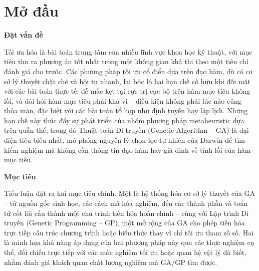 \chapter*{Mở đầu}
\label{chap:mo-dau}

\noindent\textbf{Đặt vấn đề}
\medskip

Tối ưu hóa là bài toán trung tâm của nhiều lĩnh vực khoa học kỹ thuật,
với mục tiêu tìm ra phương án tốt nhất trong một không gian khả thi
theo một tiêu chí đánh giá cho trước. Các phương pháp tối ưu cổ điển
dựa trên đạo hàm, dù có cơ sở lý thuyết chặt chẽ và hội tụ nhanh, lại
bộc lộ hai hạn chế cố hữu khi đối mặt với các bài toán thực tế: dễ mắc
kẹt tại cực trị cục bộ trên hàm mục tiêu không lồi, và đòi hỏi hàm mục
tiêu phải khả vi -- điều kiện không phải lúc nào cũng thỏa mãn, đặc
biệt với các bài toán tổ hợp như định tuyến hay lập lịch. Những hạn chế
này thúc đẩy sự phát triển của nhóm phương pháp metaheuristic dựa trên
quần thể, trong đó Thuật toán Di truyền (Genetic Algorithm -- GA) là
đại diện tiêu biểu nhất, mô phỏng nguyên lý chọn lọc tự nhiên của
Darwin để tìm kiếm nghiệm mà không cần thông tin đạo hàm hay giả định
về tính lồi của hàm mục tiêu.

\bigskip
\noindent\textbf{Mục tiêu}
\medskip

Tiểu luận đặt ra hai mục tiêu chính. Một là hệ thống hóa cơ sở lý
thuyết của GA -- từ nguồn gốc sinh học, các cách mã hóa nghiệm, đến các
thành phần và toán tử cốt lõi cấu thành một chu trình tiến hóa hoàn
chỉnh -- cùng với Lập trình Di truyền (Genetic Programming -- GP), một
mở rộng của GA cho phép tiến hóa trực tiếp cấu trúc chương trình hoặc
biểu thức thay vì chỉ tối ưu tham số số. Hai là minh họa khả năng áp
dụng của hai phương pháp này qua các thực nghiệm cụ thể, đối chiếu trực
tiếp với các mốc nghiệm tối ưu hoặc quan hệ vật lý đã biết, nhằm đánh
giá khách quan chất lượng nghiệm mà GA/GP tìm được.

